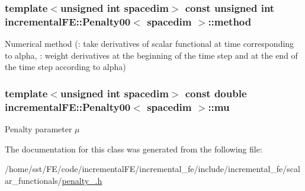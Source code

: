 \subsubsection[{\texorpdfstring{method}{method}}]{\setlength{\rightskip}{0pt plus 5cm}template$<$unsigned int spacedim$>$ const unsigned int {\bf incremental\+F\+E\+::\+Penalty00}$<$ spacedim $>$\+::method\hspace{0.3cm}{\ttfamily [private]}}\hypertarget{classincremental_f_e_1_1_penalty00_ac7ea7353834168a0cc76dbed74d4e947}{}\label{classincremental_f_e_1_1_penalty00_ac7ea7353834168a0cc76dbed74d4e947}
Numerical method ({}\+: take derivatives of scalar functional at time corresponding to {\ttfamily alpha}, {}\+: weight derivatives at the beginning of the time step and at the end of the time step according to {\ttfamily alpha}) 
\subsubsection[{\texorpdfstring{mu}{mu}}]{\setlength{\rightskip}{0pt plus 5cm}template$<$unsigned int spacedim$>$ const double {\bf incremental\+F\+E\+::\+Penalty00}$<$ spacedim $>$\+::mu\hspace{0.3cm}{\ttfamily [private]}}\hypertarget{classincremental_f_e_1_1_penalty00_a5b23dfd9218098c0f30884c4f1601716}{}\label{classincremental_f_e_1_1_penalty00_a5b23dfd9218098c0f30884c4f1601716}
Penalty parameter $\mu$ 

The documentation for this class was generated from the following file\+:\begin{DoxyCompactItemize}
\item 
/home/sst/\+F\+E/code/incremental\+F\+E/incremental\+\_\+fe/include/incremental\+\_\+fe/scalar\+\_\+functionals/\hyperlink{penalty__00_8h}{penalty\+\_.\+h}\end{DoxyCompactItemize}
